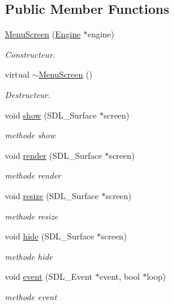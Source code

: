 \subsection*{Public Member Functions}
\begin{DoxyCompactItemize}
\item 
\hyperlink{classMenuScreen_a1b1207941e5331afa594befc3fd5d857}{Menu\-Screen} (\hyperlink{classEngine}{Engine} $\ast$engine)
\begin{DoxyCompactList}\small\item\em Constructeur. \end{DoxyCompactList}\item 
virtual \hyperlink{classMenuScreen_aa5d98169f4d2e3ef2e6520a6a5bbc47c}{$\sim$\-Menu\-Screen} ()
\begin{DoxyCompactList}\small\item\em Destructeur. \end{DoxyCompactList}\item 
void \hyperlink{classMenuScreen_a6ff381327f56f7e40ae481f28b241bd2}{show} (S\-D\-L\-\_\-\-Surface $\ast$screen)
\begin{DoxyCompactList}\small\item\em methode show \end{DoxyCompactList}\item 
void \hyperlink{classMenuScreen_ac26706ac22c9db9d980c9fc63315d843}{render} (S\-D\-L\-\_\-\-Surface $\ast$screen)
\begin{DoxyCompactList}\small\item\em methode render \end{DoxyCompactList}\item 
void \hyperlink{classMenuScreen_a92fe1ecb63138057739cd6325179ef9a}{resize} (S\-D\-L\-\_\-\-Surface $\ast$screen)
\begin{DoxyCompactList}\small\item\em methode resize \end{DoxyCompactList}\item 
void \hyperlink{classMenuScreen_a6e1f118966c89b894c02ad7181e1c994}{hide} (S\-D\-L\-\_\-\-Surface $\ast$screen)
\begin{DoxyCompactList}\small\item\em methode hide \end{DoxyCompactList}\item 
void \hyperlink{classMenuScreen_afbffa22948c7e335e5db27233bc661b9}{event} (S\-D\-L\-\_\-\-Event $\ast$event, bool $\ast$loop)
\begin{DoxyCompactList}\small\item\em methode event \end{DoxyCompactList}\item 

\end{DoxyCompactItemize}
